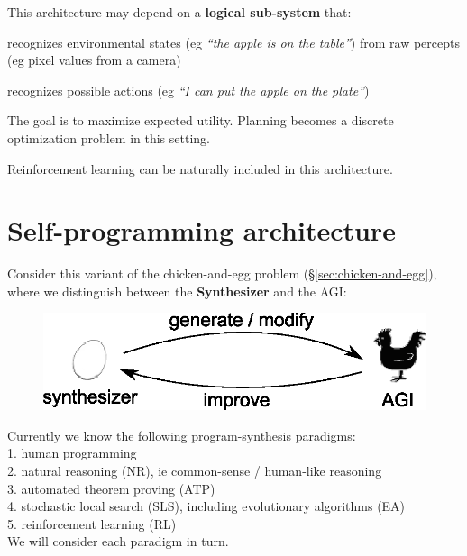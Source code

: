 This architecture may depend on a \textbf{logical sub-system} that:
\begin{compactenum}[1.]
\item  recognizes environmental states (eg \textit{``the apple is on the table''}) from raw percepts (eg pixel values from a camera)
\item  recognizes possible actions (eg \textit{``I can put the apple on the plate''})
\\
\end{compactenum}

The goal is to maximize expected utility.  Planning becomes a discrete optimization problem in this setting.

Reinforcement learning  can be naturally included in this architecture.

\section{Self-programming architecture}
\label{sec:self-programming-architecture}

Consider this variant of the chicken-and-egg problem (\S\ref{sec:chicken-and-egg}), where we distinguish between the \textbf{Synthesizer} and the AGI:
\begin{figure}[H]
\centering
\includegraphics{self-programming-architecture.eps}
\vspace{-0.5cm}
\end{figure}

Currently we know the following program-synthesis paradigms:\\
1.  human programming\\
2.  natural reasoning (NR), ie common-sense / human-like reasoning\\
3.  automated theorem proving (ATP)\\
4.  stochastic local search (SLS), including evolutionary algorithms (EA)\\
5.  reinforcement learning (RL) \\
We will consider each paradigm in turn.

